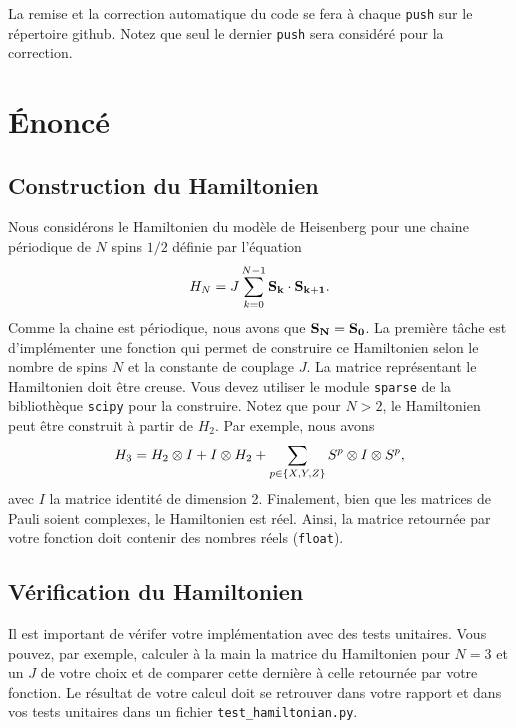 \documentclass[12pt, letterpaper]{article}
\begin{document}
\bigskip

\noindent La remise et la correction automatique du code se fera à chaque \texttt{push} sur le répertoire github.
Notez que seul le dernier \texttt{push} sera considéré pour la correction.


\section{Énoncé}\label{sec:enonce}

\subsection{Construction du Hamiltonien}\label{subsec:construction-du-hamiltonien}

\noindent Nous considérons le Hamiltonien du modèle de Heisenberg pour une chaine périodique de
$N$ spins $1/2$ définie par l'équation
\begin{equation}
  H_N = J \sum_{k=0}^{N-1} \vb{S_k} \cdot \vb{S_{k+1}}.
\end{equation}
Comme la chaine est périodique, nous avons que $\vb{S_N} = \vb{S_0}$.
La première tâche est d'implémenter une fonction qui permet de construire
ce Hamiltonien selon le nombre de spins $N$ et la constante de couplage $J$.
La matrice représentant le Hamiltonien doit être creuse.
Vous devez utiliser le module \texttt{sparse} de la bibliothèque \texttt{scipy}
pour la construire.
Notez que pour $N > 2$, le Hamiltonien peut être construit à partir de $H_2$.
Par exemple, nous avons
\begin{equation}
  H_3 = H_2 \otimes I + I \otimes H_2 + \sum_{p\in\qty{X, Y, Z}} S^p \otimes I \otimes S^p,
\end{equation}
avec $I$ la matrice identité de dimension 2.
Finalement, bien que les matrices de Pauli soient complexes,
le Hamiltonien est réel.
Ainsi, la matrice retournée par votre fonction doit contenir des nombres
réels (\texttt{float}).

\subsection{Vérification du Hamiltonien}\label{subsec:verification-du-hamiltonien}

\noindent Il est important de vérifer votre implémentation avec des tests unitaires.
Vous pouvez, par exemple, calculer à la main la matrice du Hamiltonien pour
$N = 3$ et un $J$ de votre choix et de comparer cette dernière à celle retournée par
votre fonction.
Le résultat de votre calcul doit se retrouver dans votre rapport et dans vos tests unitaires dans
un fichier \texttt{test\_hamiltonian.py}.
\end{document}
